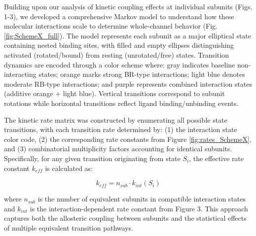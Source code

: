 \documentclass[pdflatex,sn-mathphys-num]{sn-jnl}%
\theoremstyle{thmstyleone}%
\theoremstyle{thmstyletwo}%
\theoremstyle{thmstylethree}%
\begin{document}
Building upon our analysis of kinetic coupling effects at individual subunits (Figs. 1-3), we developed a comprehensive Markov model to understand how these molecular interactions scale to determine whole-channel behavior (Fig. \ref{fig:SchemeX_full}). The model represents each subunit as a major elliptical state containing nested binding sites, with filled and empty ellipses distinguishing activated (rotated/bound) from resting (unrotated/free) states. Transition dynamics are encoded through a color scheme where: gray indicates baseline non-interacting states; orange marks strong BR-type interactions; light blue denotes moderate RB-type interactions; and purple represents combined interaction states (additive orange + light blue). Vertical transitions correspond to subunit rotations while horizontal transitions reflect ligand binding/unbinding events.

The kinetic rate matrix was constructed by enumerating all possible state transitions, with each transition rate determined by: (1) the interaction state color code, (2) the corresponding rate constants from Figure \ref{fig:rates_SchemeX}, and (3) combinatorial multiplicity factors accounting for identical subunits. Specifically, for any given transition originating from state $S_i$, the effective rate constant $k_{eff}$ is calculated as:

\begin{equation}
	k_{eff} = n_{sub} \cdot k_{int}(S_i)
\end{equation}

\noindent where $n_{sub}$ is the number of equivalent subunits in compatible interaction states and $k_{int}$ is the interaction-dependent rate constant from Figure 3. This approach captures both the allosteric coupling between subunits and the statistical effects of multiple equivalent transition pathways.
\end{document}
